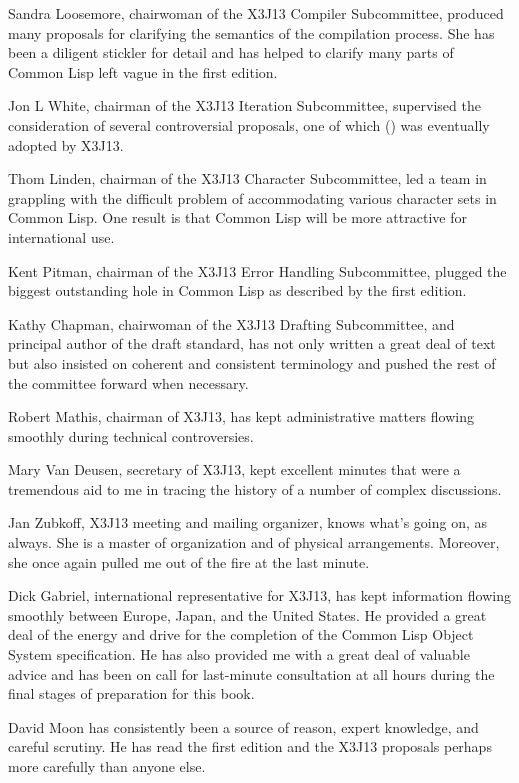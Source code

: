Sandra Loosemore, chairwoman of the X3J13 Compiler Subcommittee,
produced many proposals for clarifying the semantics of the compilation
process.  She has been a diligent stickler for detail and has helped
to clarify many parts of Common Lisp left vague in the first edition.

Jon L White, chairman of the X3J13 Iteration Subcommittee,
supervised the consideration of several controversial
proposals, one of which () was eventually adopted by X3J13.

Thom Linden, chairman of the X3J13 Character Subcommittee,
led a team in grappling with the difficult problem of accommodating
various character sets in Common Lisp.  One result is that
Common Lisp will be more attractive for international use.

Kent Pitman, chairman of the X3J13 Error Handling Subcommittee,
plugged the biggest outstanding
hole in Common Lisp as described by the first edition.

Kathy Chapman, chairwoman of the X3J13 Drafting Subcommittee,
and principal author of the draft standard, has not only written
a great deal of text but also insisted on coherent and consistent
terminology and pushed the rest of the committee forward when necessary.

Robert Mathis, chairman of X3J13, has kept administrative matters
flowing smoothly during technical controversies.

Mary Van Deusen, secretary of X3J13, kept excellent minutes
that were a tremendous aid to me in tracing the history of
a number of complex discussions.

Jan Zubkoff, X3J13 meeting and mailing
organizer, knows what's going on, as always.
She is a master of organization and of physical arrangements.
Moreover, she once again pulled me out of the fire at the last minute.

Dick Gabriel, international representative for X3J13,
has kept information flowing smoothly between Europe, Japan,
and the United States.  He provided a great deal of the energy and drive
for the completion of the Common Lisp Object System specification.
He has also provided me with a great
deal of valuable advice and has been on call for last-minute
consultation at all hours during the final stages of preparation
for this book.

David Moon has consistently been a source of reason,
expert knowledge, and careful scrutiny.  He has read the
first edition and the X3J13 proposals perhaps more carefully
than anyone else.

